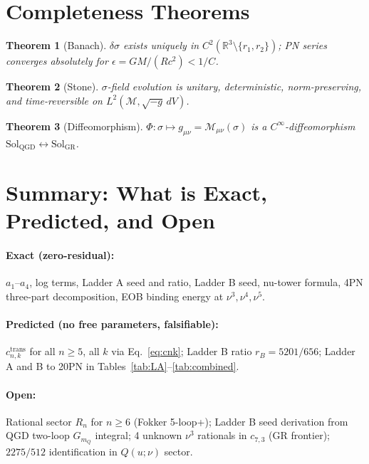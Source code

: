 \documentclass[11pt,a4paper]{article}
\theoremstyle{plain}
\newtheorem{theorem}{Theorem}[section]
\theoremstyle{definition}
\theoremstyle{remark}
\newcommand{\mQ}{m_Q}
\begin{document}
\section{Completeness Theorems}
\label{sec:complete}

\begin{theorem}[Banach]\label{thm:banach}
$\delta\sigma$ exists uniquely in $C^2(\mathbb{R}^3\setminus\{r_1,r_2\})$;
PN series converges absolutely for $\epsilon = GM/(Rc^2) < 1/C$.
\end{theorem}

\begin{theorem}[Stone]\label{thm:stone}
$\sigma$-field evolution is unitary, deterministic, norm-preserving, and
time-reversible on $L^2(\mathcal{M},\sqrt{-g}\,dV)$.
\end{theorem}

\begin{theorem}[Diffeomorphism]\label{thm:diffeo}
$\Phi:\sigma\mapsto g_{\mu\nu}=\mathcal{M}_{\mu\nu}(\sigma)$ is a
$C^\infty$-diffeomorphism $\mathrm{Sol}_{\mathrm{QGD}}\leftrightarrow\mathrm{Sol}_{\mathrm{GR}}$.
\end{theorem}

\section{Summary: What is Exact, Predicted, and Open}
\label{sec:summary}

\paragraph{Exact (zero-residual):}
$a_1$--$a_4$, log terms, Ladder A seed and ratio, Ladder B seed, nu-tower
formula, 4PN three-part decomposition, EOB binding energy at $\nu^3,\nu^4,\nu^5$.

\paragraph{Predicted (no free parameters, falsifiable):}
$c_{n,k}^{\mathrm{trans}}$ for all $n\geq5$, all $k$ via Eq.~\eqref{eq:cnk};
Ladder B ratio $r_B = 5201/656$; Ladder A and B to 20PN in Tables~\ref{tab:LA}--\ref{tab:combined}.

\paragraph{Open:}
Rational sector $R_n$ for $n\geq6$ (Fokker 5-loop+);
Ladder B seed derivation from QGD two-loop $G_{\mQ}$ integral;
4 unknown $\nu^3$ rationals in $c_{7,3}$ (GR frontier);
$2275/512$ identification in $Q(u;\nu)$ sector.
\end{document}
